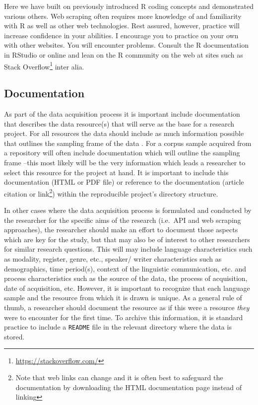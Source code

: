 \documentclass[
]{article}
\DeclareRobustCommand{\href}[2]{#2\footnote{\url{#1}}}
\begin{document}
Here we have built on previously introduced R coding concepts and demonstrated various others. Web scraping often requires more knowledge of and familiarity with R as well as other web technologies. Rest assured, however, practice will increase confidence in your abilities. I encourage you to practice on your own with other websites. You will encounter problems. Consult the R documentation in RStudio or online and lean on the R community on the web at sites such as \href{https://stackoverflow.com/}{Stack Overflow} inter alia.

\hypertarget{documentation-1}{%
\subsection{Documentation}\label{documentation-1}}

As part of the data acquisition process it is important include documentation that describes the data resource(s) that will serve as the base for a research project. For all resources the data should include as much information possible that outlines the sampling frame of the data \citep{Adel2020}. For a corpus sample acquired from a repository will often include documentation which will outline the sampling frame --this most likely will be the very information which leads a researcher to select this resource for the project at hand. It is important to include this documentation (HTML or PDF file) or reference to the documentation (article citation or link\footnote{Note that web links can change and it is often best to safeguard the documentation by downloading the HTML documentation page instead of linking}) within the reproducible project's directory structure.

In other cases where the data acquisition process is formulated and conducted by the researcher for the specific aims of the research (i.e.~API and web scraping approaches), the researcher should make an effort to document those aspects which are key for the study, but that may also be of interest to other researchers for similar research questions. This will may include language characteristics such as modality, register, genre, etc., speaker/ writer characteristics such as demographics, time period(s), context of the linguistic communication, etc. and process characteristics such as the source of the data, the process of acquisition, date of acquisition, etc. However, it is important to recognize that each language sample and the resource from which it is drawn is unique. As a general rule of thumb, a researcher should document the resource as if this were a resource \emph{they} were to encounter for the first time. To archive this information, it is standard practice to include a \texttt{README} file in the relevant directory where the data is stored.
\end{document}
